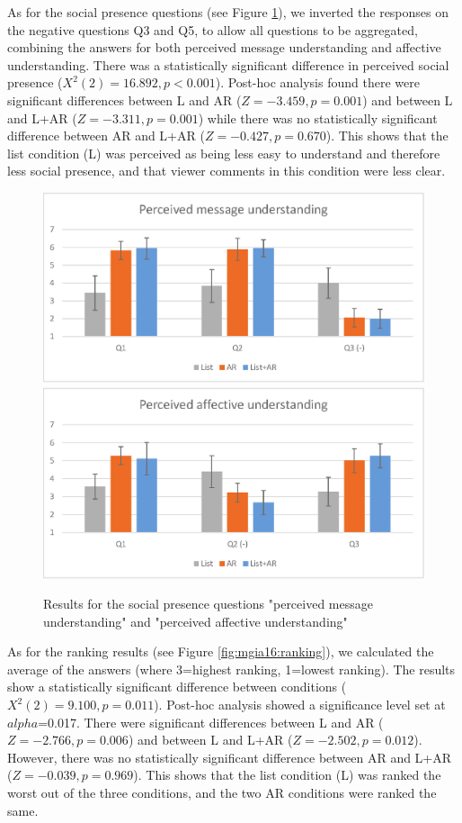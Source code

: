 As for the social presence questions (see Figure \ref{fig:mgia16:social_presence}), we inverted the responses on the negative questions Q3 and Q5, to allow all questions to be aggregated, combining the answers for both perceived message understanding and affective understanding. There was a statistically significant difference in perceived social presence ($X^2(2)=16.892, p<0.001$). Post-hoc analysis found there were significant differences between L and AR ($Z=-3.459, p=0.001$) and between L and L+AR ($Z=-3.311, p=0.001$) while there was no statistically significant difference between AR and L+AR ($Z=-0.427, p=0.670$). This shows that the list condition (L) was perceived as being less easy to understand and therefore less social presence, and that viewer comments in this condition were less clear.

\begin{figure}[ht]
  \centering
  \includegraphics[width=.8\linewidth]{images/mgia16/message.eps}
  \includegraphics[width=.8\linewidth]{images/mgia16/affective.eps}
  \caption{Results for the social presence questions "perceived message understanding" and "perceived affective understanding"}
	\label{fig:mgia16:social_presence}
\end{figure}

As for the ranking results (see Figure \ref{fig:mgia16:ranking}), we calculated the average of the answers (where 3=highest ranking, 1=lowest ranking). The results show a statistically significant difference between conditions ($X^2(2)=9.100, p=0.011$). Post-hoc analysis showed a significance level set at $alpha$=0.017. There were significant differences between L and AR ($Z=-2.766, p=0.006$) and between L and L+AR ($Z=-2.502, p=0.012$). However, there was no statistically significant difference between AR and L+AR ($Z=-0.039, p=0.969$). This shows that the list condition (L) was ranked the worst out of the three conditions, and the two AR conditions were ranked the same.

